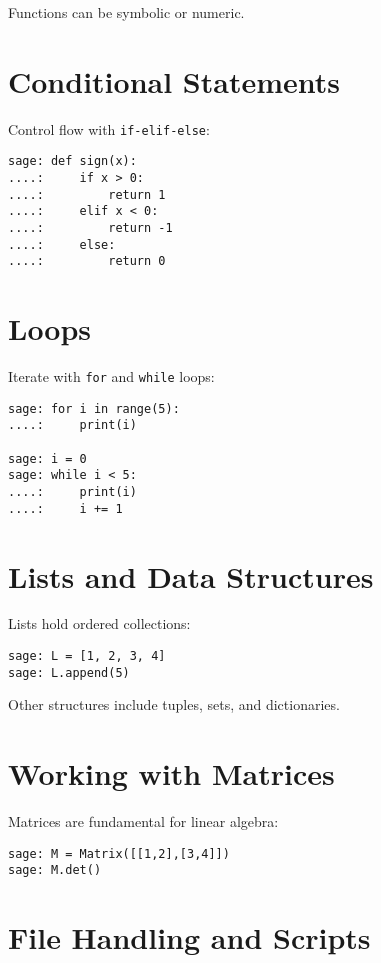 \documentclass[12pt]{book}
\begin{document}
Functions can be symbolic or numeric.

\section{Conditional Statements}

Control flow with \texttt{if-elif-else}:

\begin{verbatim}
sage: def sign(x):
....:     if x > 0:
....:         return 1
....:     elif x < 0:
....:         return -1
....:     else:
....:         return 0
\end{verbatim}

\section{Loops}

Iterate with \texttt{for} and \texttt{while} loops:

\begin{verbatim}
sage: for i in range(5):
....:     print(i)

sage: i = 0
sage: while i < 5:
....:     print(i)
....:     i += 1
\end{verbatim}

\section{Lists and Data Structures}

Lists hold ordered collections:

\begin{verbatim}
sage: L = [1, 2, 3, 4]
sage: L.append(5)
\end{verbatim}

Other structures include tuples, sets, and dictionaries.

\section{Working with Matrices}

Matrices are fundamental for linear algebra:

\begin{verbatim}
sage: M = Matrix([[1,2],[3,4]])
sage: M.det()
\end{verbatim}

\section{File Handling and Scripts}
\end{document}
